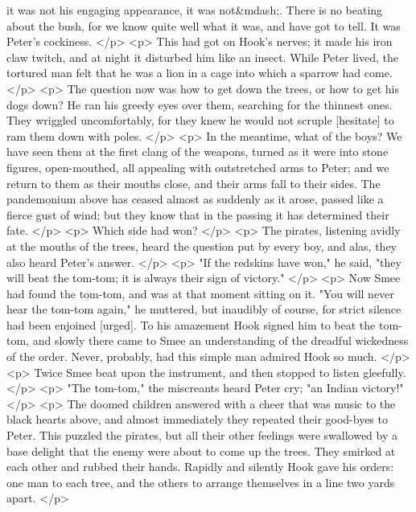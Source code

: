       it was not his engaging appearance, it was not&mdash;. There is no beating
      about the bush, for we know quite well what it was, and have got to tell.
      It was Peter's cockiness.
    </p>
    <p>
      This had got on Hook's nerves; it made his iron claw twitch, and at night
      it disturbed him like an insect. While Peter lived, the tortured man felt
      that he was a lion in a cage into which a sparrow had come.
    </p>
    <p>
      The question now was how to get down the trees, or how to get his dogs
      down? He ran his greedy eyes over them, searching for the thinnest ones.
      They wriggled uncomfortably, for they knew he would not scruple [hesitate]
      to ram them down with poles.
    </p>
    <p>
      In the meantime, what of the boys? We have seen them at the first clang of
      the weapons, turned as it were into stone figures, open-mouthed, all
      appealing with outstretched arms to Peter; and we return to them as their
      mouths close, and their arms fall to their sides. The pandemonium above
      has ceased almost as suddenly as it arose, passed like a fierce gust of
      wind; but they know that in the passing it has determined their fate.
    </p>
    <p>
      Which side had won?
    </p>
    <p>
      The pirates, listening avidly at the mouths of the trees, heard the
      question put by every boy, and alas, they also heard Peter's answer.
    </p>
    <p>
      "If the redskins have won," he said, "they will beat the tom-tom; it is
      always their sign of victory."
    </p>
    <p>
      Now Smee had found the tom-tom, and was at that moment sitting on it. "You
      will never hear the tom-tom again," he muttered, but inaudibly of course,
      for strict silence had been enjoined [urged]. To his amazement Hook signed
      him to beat the tom-tom, and slowly there came to Smee an understanding of
      the dreadful wickedness of the order. Never, probably, had this simple man
      admired Hook so much.
    </p>
    <p>
      Twice Smee beat upon the instrument, and then stopped to listen gleefully.
    </p>
    <p>
      "The tom-tom," the miscreants heard Peter cry; "an Indian victory!"
    </p>
    <p>
      The doomed children answered with a cheer that was music to the black
      hearts above, and almost immediately they repeated their good-byes to
      Peter. This puzzled the pirates, but all their other feelings were
      swallowed by a base delight that the enemy were about to come up the
      trees. They smirked at each other and rubbed their hands. Rapidly and
      silently Hook gave his orders: one man to each tree, and the others to
      arrange themselves in a line two yards apart.
    </p>
